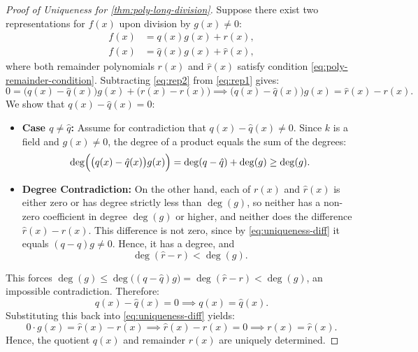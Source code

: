 \begin{content}
\begin{proof}[Proof of Uniqueness for \cref{thm:poly-long-division}]
Suppose there exist two representations for $f(x)$ upon division by $g(x) \neq 0$:
\begin{align}
f(x) &= q(x) g(x) + r(x), \label{eq:rep1} \\
f(x) &= \hat{q}(x) g(x) + \hat{r}(x), \label{eq:rep2}
\end{align}
where both remainder polynomials $r(x)$ and $\hat{r}(x)$ satisfy condition \eqref{eq:poly-remainder-condition}.
Subtracting \eqref{eq:rep2} from \eqref{eq:rep1} gives:
\begin{equation}\label{eq:uniqueness-diff}
0 = \bigl(q(x) - \hat{q}(x)\bigr) g(x) + \bigl(r(x) - \hat{r}(x)\bigr) \implies \bigl(q(x) - \hat{q}(x)\bigr) g(x) = \hat{r}(x) - r(x).
\end{equation}
We show that $q(x) - \hat{q}(x) = 0$:
\begin{itemize}
    \item \textbf{Case $q \neq \hat{q}$:} Assume for contradiction that $q(x) - \hat{q}(x) \neq 0$. Since $k$ is a field and $g(x) \neq 0$, the degree of a product equals the sum of the degrees:
    \[
    \deg\Bigl(\bigl(q(x) - \hat{q}(x)\bigr) g(x)\Bigr) = \deg(q - \hat{q}) + \deg(g) \ge \deg(g).
    \]
    \item \textbf{Degree Contradiction:} On the other hand, each of $r(x)$ and $\hat{r}(x)$ is either zero or has degree strictly less than $\deg(g)$, so neither has a non-zero coefficient in degree $\deg(g)$ or higher, and neither does the difference $\hat{r}(x) - r(x)$. This difference is not zero, since by \eqref{eq:uniqueness-diff} it equals $(q - \hat{q}) g \neq 0$. Hence, it has a degree, and
    \[
    \deg(\hat{r} - r) < \deg(g).
    \]
\end{itemize}
This forces $\deg(g) \le \deg\bigl((q - \hat{q})g\bigr) = \deg(\hat{r} - r) < \deg(g)$, an impossible contradiction.
Therefore:
\[
q(x) - \hat{q}(x) = 0 \implies q(x) = \hat{q}(x).
\]
Substituting this back into \eqref{eq:uniqueness-diff} yields:
\[
0 \cdot g(x) = \hat{r}(x) - r(x) \implies \hat{r}(x) - r(x) = 0 \implies r(x) = \hat{r}(x).
\]
Hence, the quotient $q(x)$ and remainder $r(x)$ are uniquely determined.
\end{proof}


\end{content}
